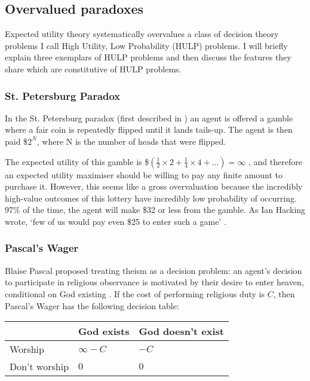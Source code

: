 \documentclass{article}
\begin{document}
\subsection {Overvalued paradoxes}

Expected utility theory systematically overvalues a class of decision theory problems I call High Utility, Low Probability (HULP) problems. I will briefly explain three exemplars of HULP problems and then discuss the features they share which are constitutive of HULP problems.

\subsubsection {St. Petersburg Paradox}

In the St. Petersburg paradox (first described in \citep{bernoulli1954exposition}) an agent is offered a gamble where a fair coin is repeatedly flipped until it lands tails-up. The agent is then paid \$\(2^N\), where N is the number of heads that were flipped. 

The expected utility of this gamble is \$\((\frac{1}{2}\times2 + \frac{1}{4}\times4+...) = \infty\) \citep{resnik1987choices}, and therefore an expected utility maximiser should be willing to pay any finite amount to purchase it. However, this seems like a gross overvaluation because the incredibly high-value outcomes of this lottery have incredibly low probability of occurring. 97\% of the time, the agent will make \$32 or less from the gamble. As Ian Hacking wrote, `few of us would pay even \$25 to enter such
 a game' \citep{hacking1980strange}.

\subsubsection {Pascal's Wager}

Blaise Pascal proposed treating theism as a decision problem: an agent's decision to participate in religious observance is motivated by their desire to enter heaven, conditional on God existing \citep{pascal1852pensees}. If the cost of performing religious duty is \(C\), then Pascal's Wager has the following decision table:

\begin{center}
\begin{tabular}{ | l | l | l |}
  \hline
    & God exists & God doesn't exist \\ \hline
  Worship & \(\infty-C\) & \(-C\) \\ \hline
  Don't worship & \(0\)  & \(0\) \\
  \hline
\end{tabular}
\end{center}
\end{document}
